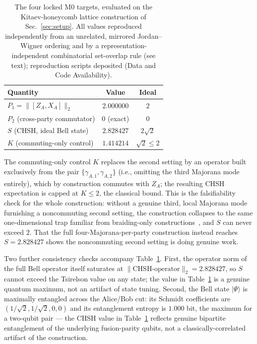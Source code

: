 \documentclass[aps,pra,twocolumn,superscriptaddress,floatfix,nofootinbib]{revtex4-2}
\providecommand{\ket}[1]{\lvert #1 \rangle}
\begin{document}
\begin{table}[!h]
\centering
\caption{The four locked M0 targets, evaluated on the Kitaev-honeycomb
lattice construction of Sec.~\ref{sec:setup}. All values reproduced
independently from an unrelated, mirrored Jordan--Wigner ordering and
by a representation-independent combinatorial set-overlap rule (see
text); reproduction scripts deposited (Data and Code Availability).}
\label{tab:m0}
\begin{tabular}{lcc}
\toprule
Quantity & Value & Ideal \\
\midrule
$P_1=\lVert[Z_A,X_A]\rVert_2$        & $2.000000$ & $2$ \\
$P_2$ (cross-party commutator)       & $0$ (exact) & $0$ \\
$S$ (CHSH, ideal Bell state)         & $2.828427$ & $2\sqrt2$ \\
$K$ (commuting-only control)         & $1.414214$ & $\sqrt2\le2$ \\
\bottomrule
\end{tabular}
\end{table}

The commuting-only control $K$ replaces the second setting by an
operator built exclusively from the pair $\{\gamma_{A,1},\gamma_{A,2}\}$
(i.e., omitting the third Majorana mode entirely), which by
construction commutes with $Z_A$; the resulting CHSH expectation is
capped at $K\le2$, the classical bound. This is the falsifiability
check for the whole construction: without a genuine third, local
Majorana mode furnishing a noncommuting second setting, the
construction collapses to the same one-dimensional trap familiar from
braiding-only constructions~\cite{Brennen2009}, and $S$ can never
exceed $2$. That the full four-Majorana-per-party construction instead
reaches $S=2.828427$ shows the noncommuting second setting is doing
genuine work.

Two further consistency checks accompany Table~\ref{tab:m0}. First,
the operator norm of the full Bell operator itself saturates at
$\lVert\text{CHSH-operator}\rVert_2=2.828427$, so $S$ cannot exceed
the Tsirelson value on any state; the value in Table~\ref{tab:m0} is a
genuine quantum maximum, not an artifact of state tuning. Second, the
Bell state $\ket{\Psi}$ is maximally entangled across the Alice/Bob
cut: its Schmidt coefficients are $(1/\sqrt2,1/\sqrt2,0,0)$ and its
entanglement entropy is $1.000$ bit, the maximum for a two-qubit pair
--- the CHSH value in Table~\ref{tab:m0} reflects genuine bipartite
entanglement of the underlying fusion-parity qubits, not a
classically-correlated artifact of the construction.
\end{document}
